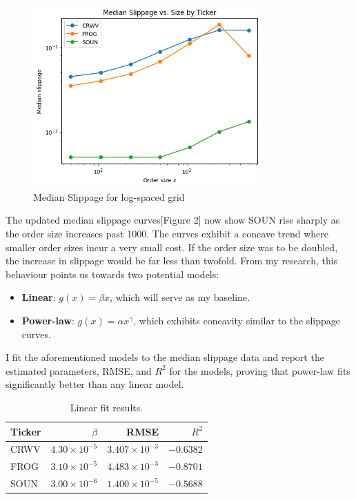 \documentclass[12pt, letterpaper]{article}
\begin{document}
\begin{figure}[h!] %
    \centering
    \includegraphics[width=0.78\textwidth]{res/images/median_slippage_med_grid.png} %
    \caption{Median Slippage for log-spaced grid}
    \label{fig:slippage_log_grid}
\end{figure}


The updated median slippage curves[Figure 2] now show SOUN rise sharply as the order size increases past 1000. The curves exhibit a concave trend where smaller order sizes incur a very small cost. If the order size was to be doubled, the increase in slippage would be far less than twofold. From my research, this behaviour points us towards two potential models:
\begin{itemize}
    \item \textbf{Linear}: $g(x) = \beta x$, which will serve as my baseline.
    \item \textbf{Power-law}: $g(x) = \alpha x^\gamma$, which exhibits concavity similar to the slippage curves.
\end{itemize}



I fit the aforementioned models to the median slippage data and report the estimated parameters, RMSE, and $R^2$ for the models, proving that power-law fits significantly better than any linear model.

\begin{table}[h!]
\centering
\begin{tabular}{lrrr} 
\toprule
Ticker & $\beta$ & RMSE & $R^2$ \\
\midrule 
CRWV  & $4.30\times10^{-5}$ & $3.407\times10^{-3}$ & $-0.6382$ \\
FROG  & $3.10\times10^{-5}$ & $4.483\times10^{-3}$ & $-0.8701$ \\
SOUN  & $3.00\times10^{-6}$ & $1.400\times10^{-5}$ & $-0.5688$ \\
\bottomrule
\end{tabular}
\caption{Linear fit results.}
\end{table}
\end{document}
